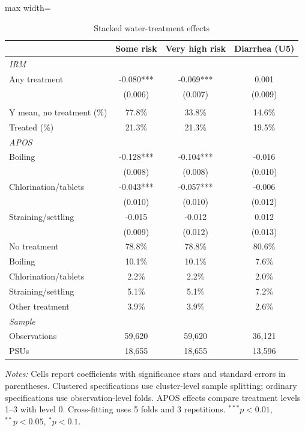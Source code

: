 \begin{table}[htbp]
\centering
\caption{Stacked water-treatment effects}
\label{tab:water-treatment-main}
\scriptsize
\setlength{\tabcolsep}{4pt}
\renewcommand{\arraystretch}{0.92}
\begin{adjustbox}{max width=\linewidth}
\begin{tabular}{lccc}
\hline\hline
 & Some risk & Very high risk & Diarrhea (U5) \\
\hline
\multicolumn{4}{l}{\textit{IRM}} \\
Any treatment & -0.080*** & -0.069*** & 0.001 \\
 & (0.006) & (0.007) & (0.009) \\
\addlinespace[6pt]
\multicolumn{4}{l}{\textit{Descriptive statistics}} \\
Y mean, no treatment (\%) & 77.8\% & 33.8\% & 14.6\% \\
Treated (\%) & 21.3\% & 21.3\% & 19.5\% \\
\midrule
\multicolumn{4}{l}{\textit{APOS}} \\
Boiling & -0.128*** & -0.104*** & -0.016 \\
 & (0.008) & (0.008) & (0.010) \\
Chlorination/tablets & -0.043*** & -0.057*** & -0.006 \\
 & (0.010) & (0.010) & (0.012) \\
Straining/settling & -0.015 & -0.012 & 0.012 \\
 & (0.009) & (0.012) & (0.013) \\
\addlinespace[6pt]
No treatment & 78.8\% & 78.8\% & 80.6\% \\
Boiling & 10.1\% & 10.1\% & 7.6\% \\
Chlorination/tablets & 2.2\% & 2.2\% & 2.0\% \\
Straining/settling & 5.1\% & 5.1\% & 7.2\% \\
Other treatment & 3.9\% & 3.9\% & 2.6\% \\
\midrule
\multicolumn{4}{l}{\textit{Sample}} \\
Observations & 59,620 & 59,620 & 36,121 \\
PSUs & 18,655 & 18,655 & 13,596 \\
\hline\hline
\end{tabular}
\end{adjustbox}
\par\vspace{3pt}
\begin{minipage}{\linewidth}\scriptsize \textit{Notes:} Cells report coefficients with significance stars and standard errors in parentheses. Clustered specifications use cluster-level sample splitting; ordinary specifications use observation-level folds. APOS effects compare treatment levels 1--3 with level 0. Cross-fitting uses 5 folds and 3 repetitions. $^{***}p<0.01$, $^{**}p<0.05$, $^{*}p<0.1$.\end{minipage}
\end{table}
